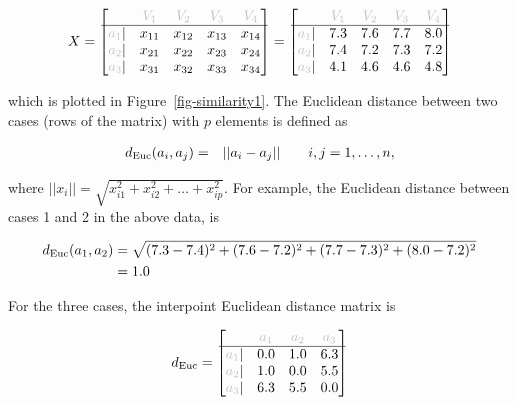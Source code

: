 \documentclass[
  letterpaper,
]{krantz}
\begin{document}
\begin{align*}
X = \begin{bmatrix}
& {\color{grey} V_1} & {\color{grey} V_2} & {\color{grey} V_3} & {\color{grey} V_4} \\\hline
{\color{grey} a_1} | & x_{11} & x_{12} & x_{13} & x_{14} \\
{\color{grey} a_2} | & x_{21} & x_{22} & x_{23} & x_{24} \\
{\color{grey} a_3} | & x_{31} & x_{32} & x_{33} & x_{34}    
\end{bmatrix}
=  \begin{bmatrix}
& {\color{grey} V_1} & {\color{grey} V_2} & {\color{grey} V_3} & {\color{grey} V_4} \\\hline
{\color{grey} a_1} | & 7.3 & 7.6 & 7.7 & 8.0 \\
{\color{grey} a_2} | & 7.4 & 7.2 & 7.3 & 7.2 \\
{\color{grey} a_3} | & 4.1 & 4.6 & 4.6 & 4.8 
\end{bmatrix}
\end{align*}

\noindent which is plotted in Figure~\ref{fig-similarity1}. The
Euclidean distance between two cases (rows of the matrix) with \(p\)
elements is defined as

\begin{align*}
d_{\rm Euc}(a_i,a_j) &=& ||a_i-a_j|| %
~~~~~~i,j=1,\dots, n,
\end{align*}

\noindent where \(||x_i||=\sqrt{x_{i1}^2+x_{i2}^2+\dots +x_{ip}^2}\).
For example, the Euclidean distance between cases 1 and 2 in the above
data, is

\begin{align*}
d_{\rm Euc}(a_1,a_2) &= \sqrt{(7.3-7.4)^2+(7.6-7.2)^2+ (7.7-7.3)^2+(8.0-7.2)^2} \\
&= 1.0 
\end{align*}


\noindent For the three cases, the interpoint Euclidean distance matrix
is

\begin{align*}
d_{\rm Euc} = \begin{bmatrix}
& {\color{grey} a_1} & {\color{grey} a_2} & {\color{grey} a_3} \\\hline
{\color{grey} a_1} | & 0.0 & 1.0 & 6.3 \\
{\color{grey} a_2} | & 1.0 & 0.0 & 5.5 \\
{\color{grey} a_3} | & 6.3 & 5.5 & 0.0
\end{bmatrix}
\end{align*}
\end{document}
